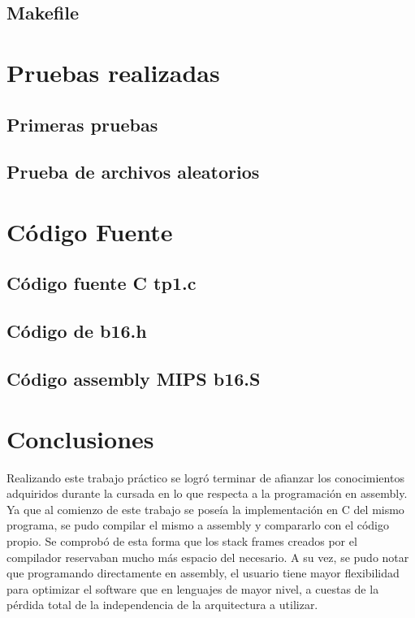 \documentclass{article}
\begin{document}
\subsection{Makefile}


\section{Pruebas realizadas}
\subsection{Primeras pruebas}

\subsection{Prueba de archivos aleatorios}


\section{C\'odigo Fuente}
\subsection{C\'odigo fuente C tp1.c}

\subsection{C\'odigo de b16.h}

\subsection{C\'odigo assembly MIPS b16.S}



\section{Conclusiones}
Realizando este trabajo práctico se logró terminar de afianzar los conocimientos adquiridos durante la cursada en lo que respecta a la programación en assembly.
Ya que al comienzo de este trabajo se poseía la implementación en C del mismo programa, se pudo compilar el mismo a assembly y compararlo con el código propio. Se comprobó de esta forma que los stack frames creados por el compilador reservaban mucho más espacio del necesario. A su vez, se pudo notar que programando directamente en assembly, el usuario tiene mayor flexibilidad para optimizar el software que en lenguajes de mayor nivel, a cuestas de la pérdida total de la independencia de la arquitectura a utilizar. 
\end{document}
